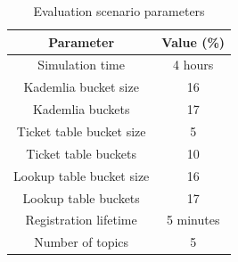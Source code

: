 \begin{table}[!hbt]
\centering
\scriptsize
\begin{tabular}{|c|c|}%
\hline
Parameter     & Value (\%) \\
\hline
\hline
Simulation time & 4 hours \\%
\hline
Kademlia bucket size & 16 \\%
\hline
Kademlia buckets & 17 \\%
\hline
Ticket table bucket size & 5 \\%
\hline
Ticket table buckets & 10 \\%
\hline
Lookup table bucket size & 16 \\%
\hline
Lookup table buckets & 17 \\%
\hline
Registration lifetime & 5 minutes \\%
\hline
Number of topics & 5 \\%
\hline
\bottomrule
\end{tabular}
\vspace{2mm}
\caption{Evaluation scenario parameters}
\label{tab:param}
\vspace{-0.05in}
\end{table}





